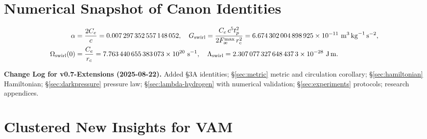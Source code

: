\documentclass[11pt]{article}
\begin{document}
    \section*{Numerical Snapshot of Canon Identities}
    \begin{align}
        \alpha &= \frac{2\Ce}{c} = \num{0.007297352557148052},\quad
        G_{\text{swirl}} = \frac{\Ce\,c^5 \tp^2}{2\aeforce\,\rc^2} = \num{6.674302004898925e-11}\ \si{m^3\,kg^{-1}\,s^{-2}},\\
        \Om(0) &= \frac{\Ce}{\rc} = \num{7.763440655383073e20}\ \si{s^{-1}},\quad
        \Lam = \num{2.3070773276484373e-28}\ \si{J.m}.
    \end{align}

    \vspace{1em}
    \noindent\textbf{Change Log for v0.7-Extensions (2025-08-22).} Added \S3A identities; \S\ref{sec:metric} metric and circulation corollary; \S\ref{sec:hamiltonian} Hamiltonian; \S\ref{sec:darkpressure} pressure law; \S\ref{sec:lambda-hydrogen} with numerical validation; \S\ref{sec:experiments} protocols; research appendices.




    \section{Clustered New Insights for VAM}

\end{document}
